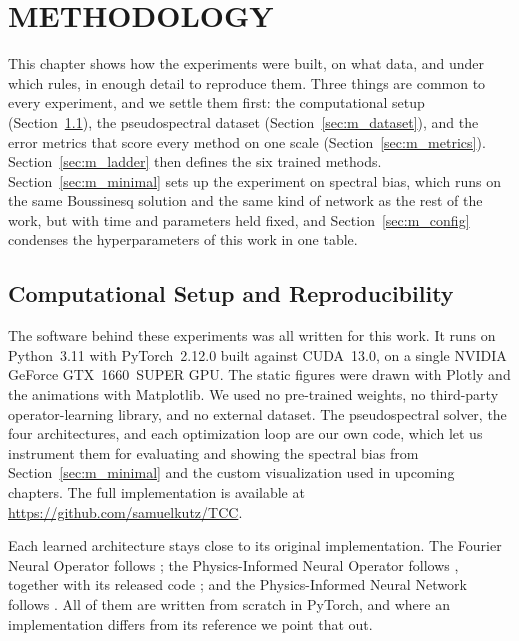 
\chapter{METHODOLOGY}
\label{chap:methodology}

This chapter shows how the experiments were built, on what data, and under which rules, in enough detail to reproduce them. Three things are common to every experiment, and we settle them first: the computational setup (Section~\ref{sec:m_setup}), the pseudospectral dataset (Section~\ref{sec:m_dataset}), and the error metrics that score every method on one scale (Section~\ref{sec:m_metrics}). Section~\ref{sec:m_ladder} then defines the six trained methods. Section~\ref{sec:m_minimal} sets up the experiment on spectral bias, which runs on the same Boussinesq solution and the same kind of network as the rest of the work, but with time and parameters held fixed, and Section~\ref{sec:m_config} condenses the hyperparameters of this work in one table.

\section{Computational Setup and Reproducibility}
\label{sec:m_setup}

The software behind these experiments was all written for this work. It runs on Python~3.11 with PyTorch~2.12.0 \parencite{paszke2019pytorch} built against CUDA~13.0, on a single NVIDIA GeForce GTX~1660~SUPER GPU. The static figures were drawn with Plotly and the animations with Matplotlib. We used no pre-trained weights, no third-party operator-learning library, and no external dataset. The pseudospectral solver, the four architectures, and each optimization loop are our own code, which let us instrument them for evaluating and showing the spectral bias from Section~\ref{sec:m_minimal} and the custom visualization used in upcoming chapters. The full implementation is available at \url{https://github.com/samuelkutz/TCC}.

Each learned architecture stays close to its original implementation. The Fourier Neural Operator follows \textcite{li2021}; the Physics-Informed Neural Operator follows \textcite{li2023pino}, together with its released code \parencite{li2023pino_code}; and the Physics-Informed Neural Network follows \textcite{raissi2019}. All of them are written from scratch in PyTorch, and where an implementation differs from its reference we point that out.

